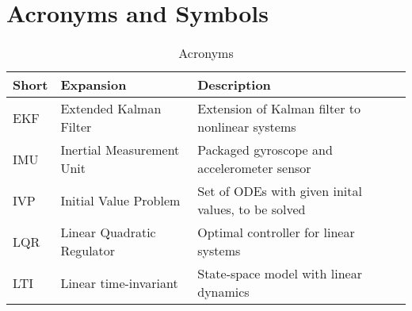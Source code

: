 \section{Acronyms and Symbols}
\begin{table}[ht]
\begin{center}
\begin{tabular}{l l l}
Short & Expansion  & Description \\
\hline
EKF & Extended Kalman Filter & Extension of Kalman filter to nonlinear systems \\
IMU & Inertial Measurement Unit & Packaged gyroscope and accelerometer sensor \\
IVP & Initial Value Problem & Set of ODEs with given inital values, to be solved \\
LQR & Linear Quadratic Regulator & Optimal controller for linear systems \\
LTI & Linear time-invariant & State-space model with linear dynamics
\end{tabular}
\end{center}
\caption{Acronyms} \label{tab:acronyms}
\end{table}



